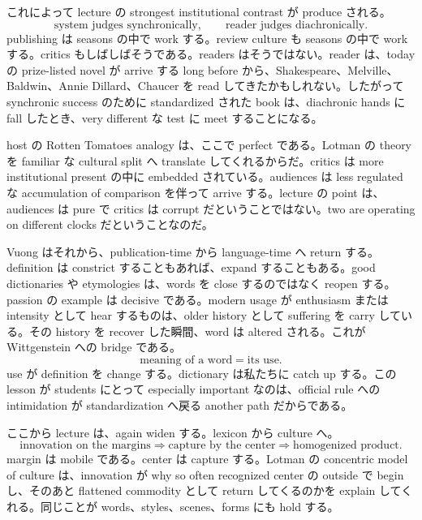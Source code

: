これによって lecture の strongest institutional contrast が produce される。
\begin{equation}
\text{system judges synchronically}, \qquad \text{reader judges diachronically}.
\end{equation}
publishing は seasons の中で work する。review culture も seasons の中で work する。critics もしばしばそうである。readers はそうではない。reader は、today の prize-listed novel が arrive する long before から、Shakespeare、Melville、Baldwin、Annie Dillard、Chaucer を read してきたかもしれない。したがって synchronic success のために standardized された book は、diachronic hands に fall したとき、very different な test に meet することになる。

host の Rotten Tomatoes analogy は、ここで perfect である。Lotman の theory を familiar な cultural split へ translate してくれるからだ。critics は more institutional present の中に embedded されている。audiences は less regulated な accumulation of comparison を伴って arrive する。lecture の point は、audiences は pure で critics は corrupt だということではない。two are operating on different clocks だということなのだ。

Vuong はそれから、publication-time から language-time へ return する。definition は constrict することもあれば、expand することもある。good dictionaries や etymologies は、words を close するのではなく reopen する。passion の example は decisive である。modern usage が enthusiasm または intensity として hear するものは、older history として suffering を carry している。その history を recover した瞬間、word は altered される。これが Wittgenstein への bridge である。
\begin{equation}
\text{meaning of a word} = \text{its use}.
\end{equation}
use が definition を change する。dictionary は私たちに catch up する。この lesson が students にとって especially important なのは、official rule への intimidation が standardization へ戻る another path だからである。

ここから lecture は、again widen する。lexicon から culture へ。
\begin{equation}
\text{innovation on the margins} \Longrightarrow \text{capture by the center} \Longrightarrow \text{homogenized product}.
\end{equation}
margin は mobile である。center は capture する。Lotman の concentric model of culture は、innovation が why so often recognized center の outside で begin し、そのあと flattened commodity として return してくるのかを explain してくれる。同じことが words、styles、scenes、forms にも hold する。

